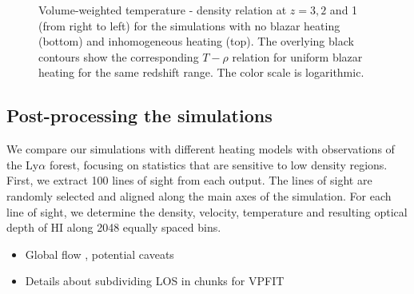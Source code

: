 \documentclass[numberedappendix]{emulateapj}
\begin{document}
\begin{figure}
\caption{ Volume-weighted temperature - density relation at $z=3,2$ and 1 (from right to left) for the simulations with no blazar heating (bottom) and inhomogeneous heating (top). The overlying black contours show the corresponding $T-\rho$ relation for uniform blazar heating \citep{2012MNRAS.423..149P} for the same redshift range. The color scale is logarithmic.}



\label{fig:rho_T}
\end{figure}



\subsection{Post-processing the simulations}
We compare our simulations with different heating models with observations of the Ly$\alpha$ forest, focusing on statistics that are sensitive to low density regions. First, we extract 100 lines of sight from each output. The lines of sight are randomly selected and aligned along the main axes of the simulation. For each line of sight, we determine the density, velocity, temperature and resulting optical depth of HI along 2048 equally spaced bins. 






\begin{itemize}
\item Global flow , potential caveats
\item Details about subdividing LOS in chunks for VPFIT
\end{itemize}
\end{document}
